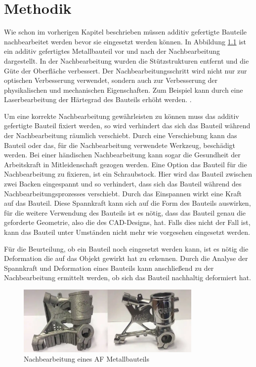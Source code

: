 

\chapter{Methodik}

Wie schon im vorherigen Kapitel beschrieben müssen additiv gefertigte Bauteile 
nachbearbeitet werden bevor sie eingesetzt werden können. In Abbildung \ref{fig:post-pro}
ist ein additiv gefertigtes Metallbauteil vor und nach der Nachbearbeitung dargestellt.
In der Nachbearbeitung wurden die Stützstrukturen entfernt und die Güte der Oberfläche 
verbessert. 
Der Nachbearbeitungsschritt wird nicht nur zur optischen Verbesserung verwendet, sondern 
auch zur Verbesserung der physikalischen und mechanischen Eigenschaften. 
Zum Beispiel kann durch eine Laserbearbeitung der Härtegrad des Bauteils erhöht werden.
\cite{Mahmood.2022}.

Um eine korrekte Nachbearbeitung gewährleisten zu können muss das additiv 
gefertigte Bauteil fixiert werden, so wird verhindert das sich das Bauteil während der 
Nachbearbeitung räumlich verschiebt. Durch eine Verschiebung kann das Bauteil oder das, für
die Nachbearbeitung verwendete Werkzeug, beschädigt werden. Bei einer händischen 
Nachbearbeitung kann sogar die Gesundheit der Arbeitskraft in Mitleidenschaft gezogen werden.
Eine Option das Bauteil für die Nachbearbeitung zu fixieren, ist ein Schraubstock. 
Hier wird das Bauteil zwischen zwei Backen eingespannt und so verhindert, dass sich das
Bauteil während des Nachbearbeitungsprozesses verschiebt. Durch das Einspannen wirkt eine 
Kraft auf das Bauteil. Diese Spannkraft kann sich auf die Form des Bauteils auswirken, für 
die weitere Verwendung des Bauteils ist es nötig, dass das Bauteil genau die geforderte 
Geometrie, also die des CAD-Designs, hat. Falls dies nicht der Fall ist, kann das Bauteil
unter Umständen nicht mehr wie vorgesehen eingesetzt werden.

Für die Beurteilung, ob ein Bauteil noch eingesetzt werden kann, ist es nötig die 
Deformation die auf das Objekt gewirkt hat zu erkennen. Durch die Analyse der Spannkraft 
und Deformation eines Bauteils kann anschließend zu der Nachbearbeitung ermittelt werden, 
ob sich das Bauteil nachhaltig deformiert hat.

\begin{figure}[H]
    \centering
    \includegraphics[width=0.8\textwidth]{images/post-processing.PNG}
    \caption{Nachbearbeitung eines AF Metallbauteils \cite{unionfab.22.08.2023}}
    \label{fig:post-pro}
\end{figure}

